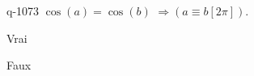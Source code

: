 \begin{truefalse}{q-1073}
$\cos(a)=\cos(b)$  $\Rightarrow \left(a\equiv b [2\pi]\right)$.
\item Vrai
\item* Faux
\end{truefalse}

